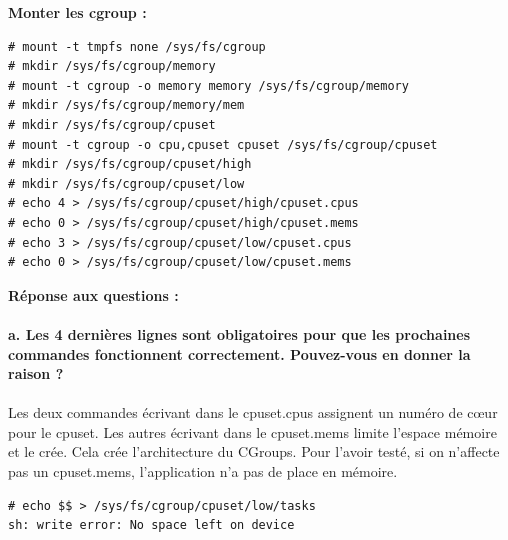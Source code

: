 \textbf{Monter les cgroup : } \\
\begin{lstlisting}
# mount -t tmpfs none /sys/fs/cgroup                                            
# mkdir /sys/fs/cgroup/memory                                                   
# mount -t cgroup -o memory memory /sys/fs/cgroup/memory                        
# mkdir /sys/fs/cgroup/memory/mem         
# mkdir /sys/fs/cgroup/cpuset                                                   
# mount -t cgroup -o cpu,cpuset cpuset /sys/fs/cgroup/cpuset                    
# mkdir /sys/fs/cgroup/cpuset/high         
# mkdir /sys/fs/cgroup/cpuset/low  
# echo 4 > /sys/fs/cgroup/cpuset/high/cpuset.cpus                               
# echo 0 > /sys/fs/cgroup/cpuset/high/cpuset.mems                               
# echo 3 > /sys/fs/cgroup/cpuset/low/cpuset.cpus                                
# echo 0 > /sys/fs/cgroup/cpuset/low/cpuset.mems                                 
\end{lstlisting}

\textbf{Réponse aux questions :}\\\\
\textbf{a. Les	4	dernières	lignes	sont	obligatoires	pour que	les	prochaines	commandes	fonctionnent	
	correctement. Pouvez-vous	en	donner	la	raison ?}\\\\
Les deux commandes écrivant dans le cpuset.cpus assignent un numéro de cœur pour le cpuset. Les autres écrivant dans le cpuset.mems limite l'espace mémoire et le crée. Cela crée l'architecture du CGroups. Pour l'avoir testé, si on n'affecte pas un cpuset.mems, l'application n'a pas de place en mémoire.
\begin{lstlisting}
# echo $$ > /sys/fs/cgroup/cpuset/low/tasks
sh: write error: No space left on device
\end{lstlisting}

